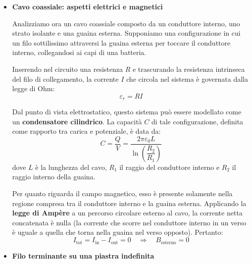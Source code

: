 \documentclass{book}
\begin{document}
\begin{itemize}
Definendo il vettore $\vec{s} = \vec{R}_1 - \vec{R}_2$ come il vettore costante che unisce l'asse del cilindro grande con l'asse della cavità (con $s = |\vec{s}|$ distanza tra i centri), il risultato è:

$$
\vec{B}(\vec{r}) = \frac{\mu_0}{2}\,\vec{J}\times\vec{s}
$$

\textbf{Considerazioni:}
Il campo magnetico all'interno della cavità risulta \textbf{uniforme} (poiché $\vec{s}$ e $\vec{J}$ sono costanti). Le linee di forza sono segmenti rettilinei. L'intensità del campo diminuisce al diminuire della distanza $s$ tra gli assi. Infine, la direzione del campo è perpendicolare sia alla congiungente dei due assi ($\vec{s}$) sia al vettore densità di corrente ($\vec{J}$).

\item 
\textbf{Cavo coassiale: aspetti elettrici e magnetici}

Analizziamo ora un cavo coassiale composto da un conduttore interno, uno strato isolante e una guaina esterna. Supponiamo una configurazione in cui un filo sottilissimo attraversi la guaina esterna per toccare il conduttore interno, collegandosi ai capi di una batteria.

Inserendo nel circuito una resistenza $R$ e trascurando la resistenza intrinseca del filo di collegamento, la corrente $I$ che circola nel sistema è governata dalla legge di Ohm:
$$
\varepsilon_r = R I
$$

Dal punto di vista elettrostatico, questo sistema può essere modellato come un \textbf{condensatore cilindrico}. La capacità $C$ di tale configurazione, definita come rapporto tra carica e potenziale, è data da:
$$
C = \frac{Q}{V} = \frac{2\pi\varepsilon_0 L}{\ln\left(\dfrac{R_2}{R_1}\right)}
$$
dove $L$ è la lunghezza del cavo, $R_1$ il raggio del conduttore interno e $R_2$ il raggio interno della guaina.

Per quanto riguarda il campo magnetico, esso è presente solamente nella regione compresa tra il conduttore interno e la guaina esterna. Applicando la \textbf{legge di Ampère} a un percorso circolare esterno al cavo, la corrente netta concatenata è nulla (la corrente che scorre nel conduttore interno in un verso è uguale a quella che torna nella guaina nel verso opposto). Pertanto:
$$
I_{\text{tot}} = I_{\text{in}} - I_{\text{out}} = 0 \quad \Longrightarrow \quad B_{\text{esterno}} = 0
$$

\item 
\textbf{Filo terminante su una piastra indefinita}


\end{itemize}
\end{document}
